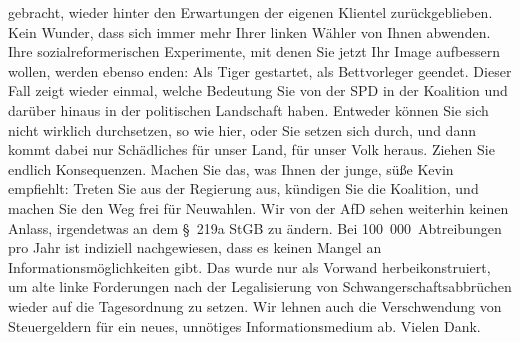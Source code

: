 \documentclass{article}
\begin{document}
gebracht, wieder hinter den Erwartungen der eigenen Klientel zurückgeblieben. Kein Wunder, dass sich immer mehr Ihrer linken Wähler von Ihnen abwenden.  Ihre sozialreformerischen Experimente, mit denen Sie jetzt Ihr Image aufbessern wollen, werden ebenso enden: Als Tiger gestartet, als Bettvorleger geendet.  Dieser Fall zeigt wieder einmal, welche Bedeutung Sie von der SPD in der Koalition und darüber hinaus in der politischen Landschaft haben. Entweder können Sie sich nicht wirklich durchsetzen, so wie hier, oder Sie setzen sich durch, und dann kommt dabei nur Schädliches für unser Land, für unser Volk heraus. Ziehen Sie endlich Konsequenzen. Machen Sie das, was Ihnen der junge, süße Kevin empfiehlt: Treten Sie aus der Regierung aus, kündigen Sie die Koalition, und machen Sie den Weg frei für Neuwahlen.  Wir von der AfD sehen weiterhin keinen Anlass, irgendetwas an dem § 219a StGB zu ändern. Bei 100 000 Abtreibungen pro Jahr ist indiziell nachgewiesen, dass es keinen Mangel an Informationsmöglichkeiten gibt. Das wurde nur als Vorwand herbeikonstruiert, um alte linke Forderungen nach der Legalisierung von Schwangerschaftsabbrüchen wieder auf die Tagesordnung zu setzen.  Wir lehnen auch die Verschwendung von Steuergeldern für ein neues, unnötiges Informationsmedium ab. Vielen Dank.  
\end{document}
